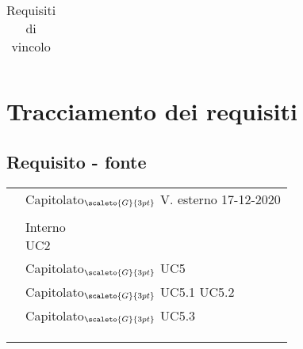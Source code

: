 {{{{\begin{center}
\begin{longtable}{|p{3cm}|p{4cm}|p{4cm}|p{4cm}|}
		\caption[Requisiti di vincolo]{Requisiti di vincolo}\label{4.4}\\
	\end{longtable}
\end{center}

\section{Tracciamento dei requisiti}\label{RequisitiTracciamentoDeiRequisiti}

\subsection{Requisito - fonte}\label{RequisitiTracciamentoDeiRequisitiFonte}

\def\tabularxcolumn#1{m{#1}}
{
	\begin{center}
		\renewcommand{\arraystretch}{1.4}
		\begin{longtable}{|p{7.5cm}|p{7.5cm}|}
		\hline
		\rowcolor{airforceblue}
		\makecell[tc]{\textbf{Codice RS}} & \makecell[c]{\textbf{Fonte}}  \\
		\hline
		\makecell[tc]{RSFO1} & \makecell[tc]{Capitolato$_{\scaleto{G}{3pt}}$\\V. esterno 17-12-2020} \\
		\hline
		\makecell[tc]{RSFF2} & \makecell[tc]{Capitolato$_{\scaleto{G}{3pt}}$}\\
		\hline
		\makecell[tc]{RSFO3} & \makecell[tc]{Interno \\ UC2}\\
		\hline
		\makecell[tc]{RSFO4} & \makecell[tc]{Capitolato$_{\scaleto{G}{3pt}}$\\UC5}\\
		\hline
		\makecell[tc]{RSFO4.1} & \makecell[tc]{Capitolato$_{\scaleto{G}{3pt}}$\\UC5.1 \\ UC5.2}\\
		\hline
		\makecell[tc]{RSFO4.2} & \makecell[tc]{Capitolato$_{\scaleto{G}{3pt}}$\\UC5.3}\\
		\hline
		\makecell[tc]{RSFO5} & \makecell[tc]{Capitolato$_{\scaleto{G}{3pt}}$}\\
		\hline
		\makecell[tc]{RSFD5.1} & \makecell[tc]{Capitolato$_{\scaleto{G}{3pt}}$}\\ 
		\hline
		\makecell[tc]{RSFD6}& \makecell[tc]{Capitolato$_{\scaleto{G}{3pt}}$}\\

\end{longtable}
\end{center}}}}}}
